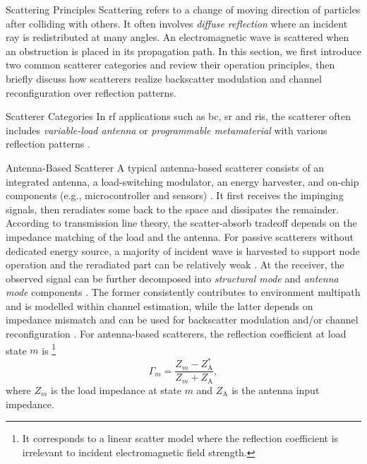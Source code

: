 \documentclass[journal]{IEEEtran}
\begin{document}
\begin{section}{Scattering Principles}
	Scattering refers to a change of moving direction of particles after colliding with others.
	It often involves \emph{diffuse reflection} where an incident ray is redistributed at many angles.
	An electromagnetic wave is scattered when an obstruction is placed in its propagation path.
	In this section, we first introduce two common scatterer categories and review their operation principles, then briefly discuss how scatterers realize backscatter modulation and channel reconfiguration over reflection patterns.
	\begin{subsection}{Scatterer Categories}
		In \gls{rf} applications such as \gls{bc}, \gls{sr} and \gls{ris}, the scatterer often includes \emph{variable-load antenna} or \emph{programmable metamaterial} with various reflection patterns \cite{Liang2022}.
		\begin{subsubsection}{Antenna-Based Scatterer}
			A typical antenna-based scatterer consists of an integrated antenna, a load-switching modulator, an energy harvester, and on-chip components (e.g., microcontroller and sensors) \cite{Dobkin2012}.
			It first receives the impinging signals, then reradiates some back to the space and dissipates the remainder.
			According to transmission line theory, the scatter-absorb tradeoff depends on the impedance matching of the load and the antenna.
			For passive scatterers without dedicated energy source, a majority of incident wave is harvested to support node operation and the reradiated part can be relatively weak \cite{Thomas2012a}.
			At the receiver, the observed signal can be further decomposed into \emph{structural mode} and \emph{antenna mode} components \cite{Hansen1989}.
			The former consistently contributes to environment multipath and is modelled within channel estimation, while the latter depends on impedance mismatch and can be used for backscatter modulation \cite{Boyer2014} and/or channel reconfiguration \cite{Liang2022}.
			For antenna-based scatterers, the reflection coefficient at load state $m$ is%
			\footnote{It corresponds to a linear scatter model where the reflection coefficient is irrelevant to incident electromagnetic field strength.}
			\begin{equation}
				\Gamma_m = \frac{Z_m - Z_{\mathrm{A}}^*}{Z_m + Z_{\mathrm{A}}},
				\label{eq:reflection_pattern_antenna}
			\end{equation}
			where $Z_m$ is the load impedance at state $m$ and $Z_{\mathrm{A}}$ is the antenna input impedance.
		\end{subsubsection}

\end{subsection}
\end{section}
\end{document}
